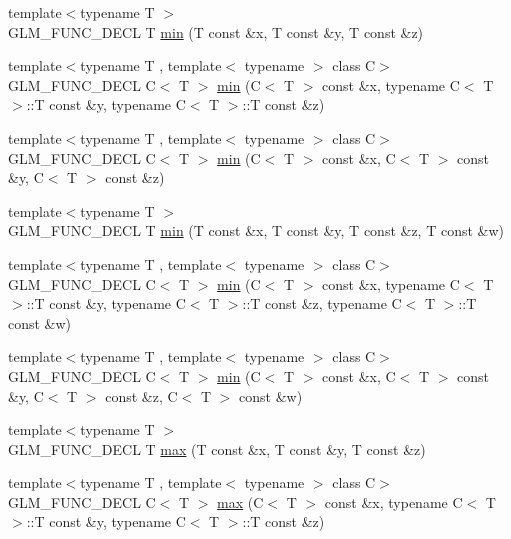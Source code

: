 \begin{DoxyCompactItemize}
\item 
{\footnotesize template$<$typename T $>$ }\\G\+L\+M\+\_\+\+F\+U\+N\+C\+\_\+\+D\+E\+C\+L T \hyperlink{group__gtx__extented__min__max_ga713d3f9b3e76312c0d314e0c8611a6a6}{min} (T const \&x, T const \&y, T const \&z)
\item 
{\footnotesize template$<$typename T , template$<$ typename $>$ class C$>$ }\\G\+L\+M\+\_\+\+F\+U\+N\+C\+\_\+\+D\+E\+C\+L C$<$ T $>$ \hyperlink{group__gtx__extented__min__max_ga74d1a96e7cdbac40f6d35142d3bcbbd4}{min} (C$<$ T $>$ const \&x, typename C$<$ T $>$\+::T const \&y, typename C$<$ T $>$\+::T const \&z)
\item 
{\footnotesize template$<$typename T , template$<$ typename $>$ class C$>$ }\\G\+L\+M\+\_\+\+F\+U\+N\+C\+\_\+\+D\+E\+C\+L C$<$ T $>$ \hyperlink{group__gtx__extented__min__max_ga42b5c3fc027fd3d9a50d2ccc9126d9f0}{min} (C$<$ T $>$ const \&x, C$<$ T $>$ const \&y, C$<$ T $>$ const \&z)
\item 
{\footnotesize template$<$typename T $>$ }\\G\+L\+M\+\_\+\+F\+U\+N\+C\+\_\+\+D\+E\+C\+L T \hyperlink{group__gtx__extented__min__max_ga95466987024d03039607f09e69813d69}{min} (T const \&x, T const \&y, T const \&z, T const \&w)
\item 
{\footnotesize template$<$typename T , template$<$ typename $>$ class C$>$ }\\G\+L\+M\+\_\+\+F\+U\+N\+C\+\_\+\+D\+E\+C\+L C$<$ T $>$ \hyperlink{group__gtx__extented__min__max_ga4fe35dd31dd0c45693c9b60b830b8d47}{min} (C$<$ T $>$ const \&x, typename C$<$ T $>$\+::T const \&y, typename C$<$ T $>$\+::T const \&z, typename C$<$ T $>$\+::T const \&w)
\item 
{\footnotesize template$<$typename T , template$<$ typename $>$ class C$>$ }\\G\+L\+M\+\_\+\+F\+U\+N\+C\+\_\+\+D\+E\+C\+L C$<$ T $>$ \hyperlink{group__gtx__extented__min__max_ga7471ea4159eed8dd9ea4ac5d46c2fead}{min} (C$<$ T $>$ const \&x, C$<$ T $>$ const \&y, C$<$ T $>$ const \&z, C$<$ T $>$ const \&w)
\item 
{\footnotesize template$<$typename T $>$ }\\G\+L\+M\+\_\+\+F\+U\+N\+C\+\_\+\+D\+E\+C\+L T \hyperlink{group__gtx__extented__min__max_ga04991ccb9865c4c4e58488cfb209ce69}{max} (T const \&x, T const \&y, T const \&z)
\item 
{\footnotesize template$<$typename T , template$<$ typename $>$ class C$>$ }\\G\+L\+M\+\_\+\+F\+U\+N\+C\+\_\+\+D\+E\+C\+L C$<$ T $>$ \hyperlink{group__gtx__extented__min__max_gae1b7bbe5c91de4924835ea3e14530744}{max} (C$<$ T $>$ const \&x, typename C$<$ T $>$\+::T const \&y, typename C$<$ T $>$\+::T const \&z)

\end{DoxyCompactItemize}

